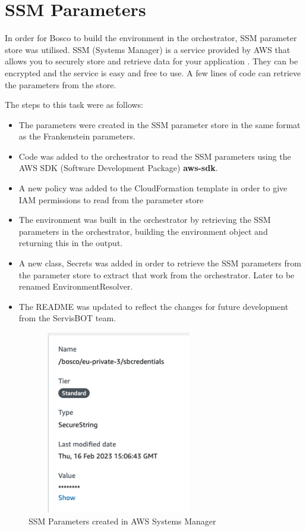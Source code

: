 \documentclass[12pt,a4paper,titlepage]{report}
\begin{document}
\section{SSM Parameters}
In order for Bosco to build the environment in the orchestrator, SSM parameter store was utilised. 
SSM (Systems Manager) is a service provided by AWS that allows you to securely store and retrieve data for your application \autocite{Halley}.
They can be encrypted and the service is easy and free to use. 
A few lines of code can retrieve the parameters from the store. 

The steps to this task were as follows:
\begin{itemize}
\item The parameters were created in the SSM parameter store in the same format as the Frankenstein parameters.
\item Code was added to the orchestrator to read the SSM parameters using the AWS SDK (Software Development Package) \textbf{aws-sdk}.
\item A new policy was added to the  CloudFormation template in order to give IAM permissions to read from the parameter store
\item The environment was built in the orchestrator by retrieving the SSM parameters in the orchestrator, building the environment object and returning this in the output.
\item A new class, Secrets was added in order to retrieve the SSM parameters from the parameter store to extract that work from the orchestrator. Later to be renamed EnvironmentResolver. 
\item The README was updated to reflect the changes for future development from the ServisBOT team.
\end{itemize}

\begin{figure}[H]
 \centering
 \includegraphics[width=8cm,height=8cm,keepaspectratio]{./diagrams/ssm_params.png}
 \caption{SSM Parameters created in AWS Systems Manager}
\end{figure}
\end{document}
